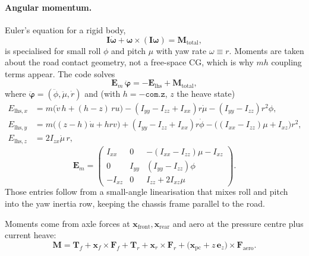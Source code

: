 \documentclass[11pt,letterpaper]{article}
\begin{document}
\paragraph{Angular momentum.}
Euler's equation for a rigid body,
\begin{equation}
  \mathbf{I}\dot{\boldsymbol{\omega}}
  + \boldsymbol{\omega}\times(\mathbf{I}\boldsymbol{\omega})
  = \mathbf{M}_{\mathrm{total}},
  \label{eq:euler}
\end{equation}
is specialised for small roll $\phi$ and pitch $\mu$ with yaw rate
$\omega\equiv r$. Moments are taken about the road contact geometry,
not a free-space CG, which is why $m h$ coupling terms appear. The
code solves
\[
  \mathbf{E}_m\,\ddot{\boldsymbol{\varphi}}
  = -\mathbf{E}_{\mathrm{lhs}} + \mathbf{M}_{\mathrm{total}},
\]
where $\ddot{\boldsymbol{\varphi}}=(\ddot\phi,\ddot\mu,\dot r)$ and (with
$h=-\texttt{com.z}$, $z$ the heave state)
\begin{align}
  E_{\mathrm{lhs},x}
  &= m\bigl(\dot v\, h + (h-z)\,r u\bigr)
     - (I_{yy}-I_{zz}+I_{xx}) r \dot\mu
     - (I_{yy}-I_{zz}) r^2 \phi,\\
  E_{\mathrm{lhs},y}
  &= m\bigl((z-h)\dot u + h r v\bigr)
     + (I_{yy}-I_{zz}+I_{xx}) r \dot\phi
     - \bigl((I_{xx}-I_{zz})\mu + I_{xz}\bigr) r^2,\\
  E_{\mathrm{lhs},z}
  &= 2 I_{zx} \dot\mu\, r,
\end{align}
\begin{equation}
  \mathbf{E}_m =
  \begin{pmatrix}
    I_{xx} & 0      & -(I_{xx}-I_{zz})\mu - I_{xz} \\
    0      & I_{yy} & (I_{yy}-I_{zz})\phi \\
    -I_{xz} & 0     & I_{zz} + 2 I_{xz} \mu
  \end{pmatrix}.
\end{equation}
Those entries follow from a small-angle linearisation that mixes
roll and pitch into the yaw inertia row, keeping the chassis frame
parallel to the road.

Moments come from axle forces at
$\mathbf{x}_{\mathrm{front}},\mathbf{x}_{\mathrm{rear}}$ and aero at the
pressure centre plus current heave:
\begin{equation}
  \mathbf{M}
  = \mathbf{T}_f + \mathbf{x}_f\times\mathbf{F}_f
  + \mathbf{T}_r + \mathbf{x}_r\times\mathbf{F}_r
  + \bigl(\mathbf{x}_{\mathrm{pc}} + z\,\mathbf{e}_z\bigr)
    \times\mathbf{F}_{\mathrm{aero}}.
  \label{eq:moment}
\end{equation}
\end{document}
